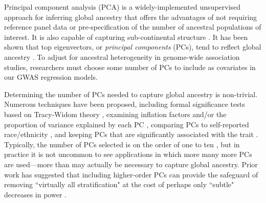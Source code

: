 \documentclass[12pt]{article}
\begin{document}
Principal component analysis (PCA) is a widely-implemented unsupervised approach for inferring global ancestry that offers the advantages of not requiring reference panel data or pre-specification of the number of ancestral populations of interest.
It is also capable of capturing sub-continental structure \citep{novembre2008}. 
It has been shown that top eigenvectors, or \textit{principal components} (PCs), %
tend to reflect global ancestry \citep{patterson2006, mcvean2009}.
To adjust for ancestral heterogeneity in genome-wide association studies, researchers must choose some number of PCs %
to include as covariates in our GWAS regression models. 

Determining the number of PCs needed to capture global ancestry is non-trivial. 
Numerous techniques have been proposed, including formal significance tests based on Tracy-Widom theory \citep{patterson2006, eigenstrat}, examining inflation factors \citep{reed2015, conomos2016} and/or the proportion of variance explained by each PC \citep{raska2012, reed2015, conomos2016}, comparing PCs to self-reported race/ethnicity \citep{conomos2016}, and keeping PCs that are significantly associated with the trait \citep{reiner2012, daya2019}.
Typically, the number of PCs selected is on the order of one to ten \citep{abegaz2019}, but in practice it is not uncommon to see applications in which more many more PCs are used---more than may actually be necessary to capture global ancestry. 
Prior work has suggested that including higher-order PCs can provide the safeguard of removing ``virtually all stratification" \citep{mathieson2012} at the cost of perhaps only ``subtle" decreases in power \citep{liu2011}.
\end{document}
